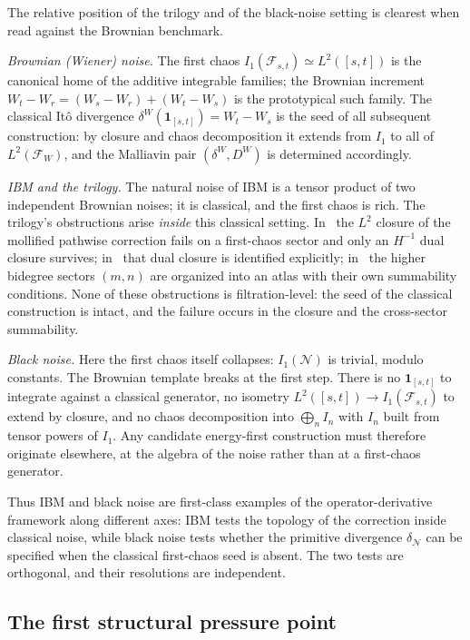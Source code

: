 \documentclass[11pt,reqno]{amsart}
\theoremstyle{plain}
\theoremstyle{definition}
\theoremstyle{remark}
\begin{document}
The relative position of the trilogy and of the black-noise setting
is clearest when read against the Brownian benchmark.

\emph{Brownian (Wiener) noise.} The first chaos
$I_1(\mathcal F_{s,t})\simeq L^2([s,t])$ is the canonical home of the
additive integrable families; the Brownian increment
$W_t-W_r=(W_s-W_r)+(W_t-W_s)$ is the prototypical such family. The
classical It\^o divergence
$\delta^W(\mathbf 1_{[s,t]})=W_t-W_s$ is the seed of all subsequent
construction: by closure and chaos decomposition it extends from
$I_1$ to all of $L^2(\mathcal F_W)$, and the Malliavin pair
$(\delta^W,D^W)$ is determined accordingly.

\emph{IBM and the trilogy.} The natural noise of IBM is a tensor
product of two independent Brownian noises; it is classical, and the
first chaos is rich. The trilogy's obstructions arise \emph{inside}
this classical setting. In~\cite{EnergyFirst} the $L^2$ closure of
the mollified pathwise correction fails on a first-chaos sector and
only an $H^{-1}$ dual closure survives; in~\cite{FCDC} that dual
closure is identified explicitly; in~\cite{BidegreeAtlas} the higher
bidegree sectors $(m,n)$ are organized into an atlas with their own
summability conditions. None of these obstructions is
filtration-level: the seed of the classical construction is intact,
and the failure occurs in the closure and the cross-sector
summability.

\emph{Black noise.} Here the first chaos itself collapses:
$I_1(\mathcal N)$ is trivial, modulo constants. The Brownian template
breaks at the first step. There is no $\mathbf 1_{[s,t]}$ to integrate
against a classical generator, no isometry
$L^2([s,t])\to I_1(\mathcal F_{s,t})$ to extend by closure, and no
chaos decomposition into $\bigoplus_n I_n$ with $I_n$ built from
tensor powers of $I_1$. Any candidate energy-first construction must
therefore originate elsewhere, at the algebra of the noise rather than
at a first-chaos generator.

Thus IBM and black noise are first-class examples of the
operator-derivative framework along different axes: IBM tests the
topology of the correction inside classical noise, while black noise
tests whether the primitive divergence $\delta_{\mathcal N}$ can be
specified when the classical first-chaos seed is absent. The two
tests are orthogonal, and their resolutions are independent.

\subsection{The first structural pressure point}\label{sec:intro-seed}
\end{document}
